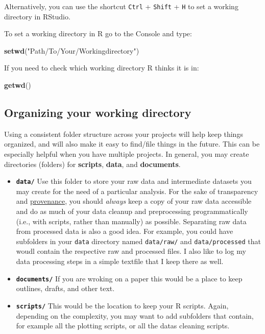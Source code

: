 \documentclass[]{book}
\newenvironment{Shaded}{\begin{snugshade}}{\end{snugshade}}
\newcommand{\KeywordTok}[1]{\textcolor[rgb]{0.13,0.29,0.53}{\textbf{{#1}}}}
\newcommand{\StringTok}[1]{\textcolor[rgb]{0.31,0.60,0.02}{{#1}}}
\newcommand{\NormalTok}[1]{{#1}}
\providecommand{\tightlist}{%
  \setlength{\itemsep}{0pt}\setlength{\parskip}{0pt}}
\theoremstyle{definition}
\theoremstyle{definition}
\theoremstyle{remark}
\begin{document}
Alternatively, you can use the shortcut \texttt{Ctrl} + \texttt{Shift} +
\texttt{H} to set a working directory in RStudio.

To set a working directory in R go to the Console and type:

\begin{Shaded}
\begin{Highlighting}[]
\KeywordTok{setwd}\NormalTok{(}\StringTok{"Path/To/Your/Workingdirectory"}\NormalTok{)}
\end{Highlighting}
\end{Shaded}

If you need to check which working directory R thinks it is in:

\begin{Shaded}
\begin{Highlighting}[]
\KeywordTok{getwd}\NormalTok{()}
\end{Highlighting}
\end{Shaded}

\subsection{Organizing your working
directory}\label{organizing-your-working-directory}

Using a consistent folder structure across your projects will help keep
things organized, and will also make it easy to find/file things in the
future. This can be especially helpful when you have multiple projects.
In general, you may create directories (folders) for \textbf{scripts},
\textbf{data}, and \textbf{documents}.

\begin{itemize}
\tightlist
\item
  \textbf{\texttt{data/}} Use this folder to store your raw data and
  intermediate datasets you may create for the need of a particular
  analysis. For the sake of transparency and
  \href{https://en.wikipedia.org/wiki/Provenance}{provenance}, you
  should \emph{always} keep a copy of your raw data accessible and do as
  much of your data cleanup and preprocessing programmatically (i.e.,
  with scripts, rather than manually) as possible. Separating raw data
  from processed data is also a good idea. For example, you could have
  subfolders in your \texttt{data} directory named \texttt{data/raw/}
  and \texttt{data/processed} that woudl contain the respective raw and
  processed files. I also like to log my data processing steps in a
  simple textfile that I keep there as well.
\item
  \textbf{\texttt{documents/}} If you are wroking on a paper this would
  be a place to keep outlines, drafts, and other text.
\item
  \textbf{\texttt{scripts/}} This would be the location to keep your R
  scripts. Again, depending on the complexity, you may want to add
  subfolders that contain, for example all the plotting scripts, or all
  the datas cleaning scripts.
\end{itemize}
\end{document}
